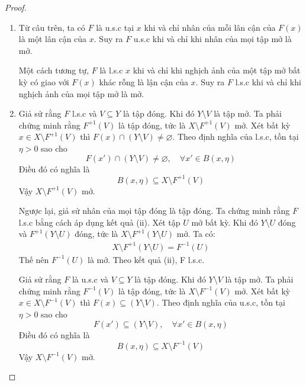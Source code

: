 \documentclass{article}
\begin{document}
\begin{proof}
\begin{enumerate}[label=(\roman*)]
        \item Từ câu trên, ta có $F$ là u.s.c tại $x$ khi và chỉ nhân của mỗi lân cận của $F(x)$ là một lân cận của $x$. Suy ra $F$ u.s.c khi và chỉ khi nhân của mọi tập mở là mở.

        Một cách tương tự, $F$ là l.s.c $x$ khi và chỉ khi nghịch ảnh của một tập mở bất kỳ có giao với $F(x)$ khác rỗng là lận cận của $x$. Suy ra $F$ l.s.c khi và chỉ khi nghịch ảnh của mọi tập mở là mở.

        \item Giả sử rằng $F$ l.s.c và $V \subseteq Y$ là tập đóng. Khi đó $Y \setminus V$ là tập mở. Ta phải chứng minh rằng $F^{+1}(V)$ là tập đóng, tức là $X \setminus F^{+1}(V)$ mở. Xét bất kỳ $x \in X \setminus F^{+1}(V)$ thì $F(x) \cap (Y\setminus V) \ne \varnothing$. Theo định nghĩa của l.s.c, tồn tại $\eta > 0$ sao cho 
        \begin{equation}
            F(x') \cap (Y\setminus V) \ne \varnothing,\quad \forall x' \in B(x, \eta)
        \end{equation}
        Điều đó có nghĩa là 
        \begin{equation}
            B(x, \eta) \subseteq X \setminus F^{+1}(V)
        \end{equation}
        Vậy $X \setminus F^{+1}(V)$ mở.

        Ngược lại, giả sử nhân của mọi tập đóng là tập đóng. Ta chứng minh rằng $F$ l.s.c bằng cách áp dụng kết quả (ii). Xét tập $U$ mở bất kỳ. Khi đó $Y \setminus U$ đóng và $F^{+1}(Y\setminus U)$ đóng, tức là $X \setminus F^{+1}(Y \setminus U)$ mở. Ta có:
        \begin{align}
            X \setminus F^{+1}(Y \setminus U) = F^{-1}(U)
        \end{align}
        Thế nên $F^{-1}(U)$ là mở. Theo kết quả (ii), F l.s.c.

        Giả sử rằng $F$ là u.s.c và $V \subseteq Y$ là tập đóng. Khi đó $Y \setminus V$ là tập mở. Ta phải chứng minh rằng $F^{-1}(V)$ là tập đóng, tức là $X \setminus F^{-1}(V)$ mở.  Xét bất kỳ $x \in X \setminus F^{-1}(V)$ thì $F(x) \subseteq (Y \setminus V)$. Theo định nghĩa của u.s.c, tồn tại $\eta > 0$ sao cho
        \begin{equation}
            F(x') \subseteq (Y \setminus V), \quad\forall x' \in B(x, \eta)
        \end{equation}
        Điều đó có nghĩa là 
        \begin{equation}
            B(x, \eta) \subseteq X \setminus F^{-1}(V)
        \end{equation}
        Vậy $X \setminus F^{-1}(V)$ mở.


\end{enumerate}
\end{proof}
\end{document}
